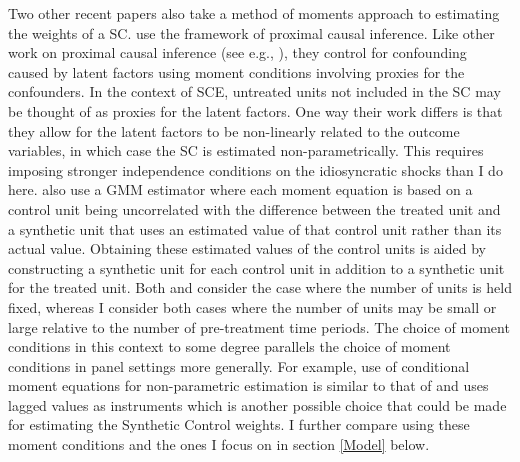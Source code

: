 \documentclass{article}
\begin{document}
\par 
Two other recent papers also take a method of moments approach to estimating the weights of a SC. \cite{shi2023} use the framework of proximal causal inference. Like other work on proximal causal inference (see e.g., \cite{ProximialIntroduction}), they control for confounding caused by latent factors using moment conditions involving proxies for the confounders. In the context of SCE, untreated units not included in the SC may be thought of as proxies for the latent factors. One way their work differs is that they allow for the latent factors to be non-linearly related to the outcome variables, in which case the SC is estimated non-parametrically. This requires imposing stronger independence conditions on the idiosyncratic shocks than I do here. \cite{Powell2021} also use a GMM estimator where each moment equation is based on a control unit being uncorrelated with the difference between the treated unit and a synthetic unit that uses an estimated value of that control unit rather than its actual value. Obtaining these estimated values of the control units is aided by constructing a synthetic unit for each control unit in addition to a synthetic unit for the treated unit. Both \cite{Powell2021} and \cite{shi2023} consider the case where the number of units is held fixed, whereas I consider both cases where the number of units may be small or large relative to the number of pre-treatment time periods. The choice of moment conditions in this context to some degree parallels the choice of moment conditions in panel settings more generally. For example, \cite{Chamberlain1992} use of conditional moment equations for non-parametric estimation is similar to that of \cite{shi2023} and \cite{Holtz-EakinNewey1988} uses lagged values as instruments which is another possible choice that could be made for estimating the Synthetic Control weights. I further compare using these moment conditions and the ones I focus on in section \ref{Model} below.
 \par
\end{document}
